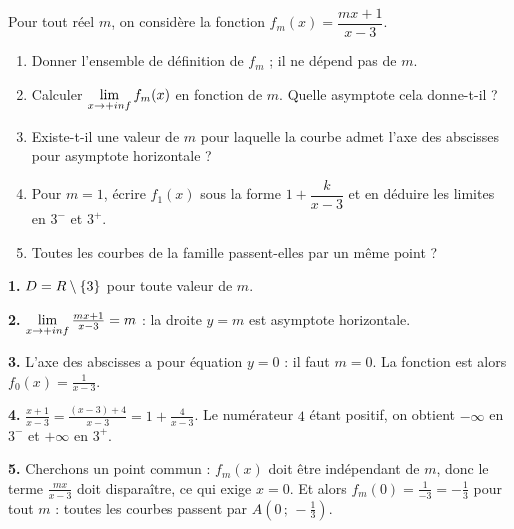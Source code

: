 \begin{jecherche}
Pour tout réel $m$, on considère la fonction
$f_{m}(x) = \dfrac{mx+1}{x-3}$.

\begin{enumerate}[label=\textbf{\arabic*.}, leftmargin=*, itemsep=0.3em]
  \item Donner l'ensemble de définition de $f_{m}$ ; il ne dépend pas de
        $m$.
  \item Calculer $\limpinf f_{m}(x)$ en fonction de $m$. Quelle asymptote
        cela donne-t-il ?
  \item Existe-t-il une valeur de $m$ pour laquelle la courbe admet l'axe des
        abscisses pour asymptote horizontale ?
  \item Pour $m = 1$, écrire $f_{1}(x)$ sous la forme
        $1+\dfrac{k}{x-3}$ et en déduire les limites en $3^{-}$ et $3^{+}$.
  \item Toutes les courbes de la famille passent-elles par un même point ?
\end{enumerate}
\end{jecherche}

\begin{corrige}
\textbf{1.} $D = R\setminus\{3\}$ pour toute valeur de $m$.

\textbf{2.} $\limpinf \frac{mx+1}{x-3} = m$ : la droite $y = m$ est
asymptote horizontale.

\textbf{3.} L'axe des abscisses a pour équation $y = 0$ : il faut $m = 0$.
La fonction est alors $f_{0}(x) = \frac{1}{x-3}$.

\textbf{4.} $\frac{x+1}{x-3} = \frac{(x-3)+4}{x-3} = 1+\frac{4}{x-3}$. Le
numérateur $4$ étant positif, on obtient $-\infty$ en $3^{-}$ et $+\infty$
en $3^{+}$.

\textbf{5.} Cherchons un point commun : $f_{m}(x)$ doit être indépendant de
$m$, donc le terme $\frac{mx}{x-3}$ doit disparaître, ce qui exige $x = 0$.
Et alors $f_{m}(0) = \frac{1}{-3} = -\frac13$ pour tout $m$ : toutes les
courbes passent par $A\left(0\,;\,-\frac13\right)$.
\end{corrige}


